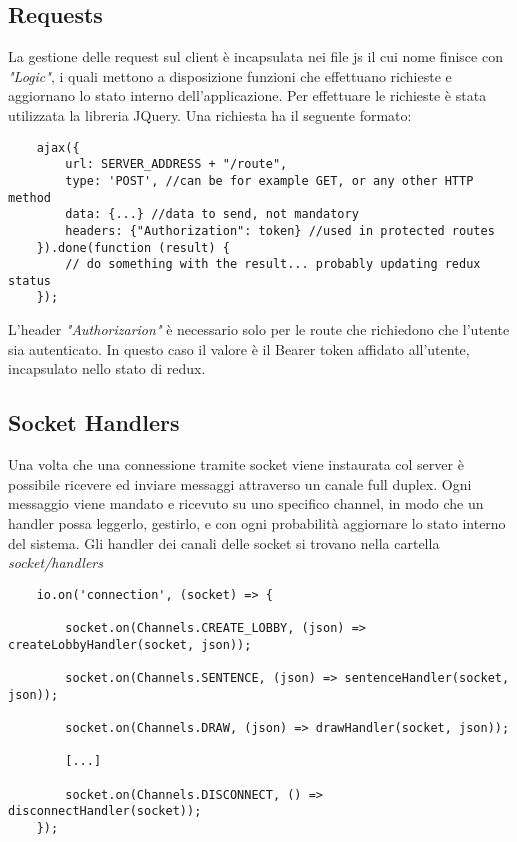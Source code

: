 \subsection{Requests}
La gestione delle request sul client è incapsulata nei file js il cui nome finisce con \textit{"Logic"}, i quali mettono a disposizione funzioni che effettuano richieste e aggiornano lo stato interno dell'applicazione.\newline
Per effettuare le richieste è stata utilizzata la libreria JQuery. Una richiesta ha il seguente formato: 
\begin{verbatim}
    ajax({
    	url: SERVER_ADDRESS + "/route",
    	type: 'POST', //can be for example GET, or any other HTTP method
    	data: {...} //data to send, not mandatory
    	headers: {"Authorization": token} //used in protected routes
    }).done(function (result) {
    	// do something with the result... probably updating redux status
    });
\end{verbatim}

L'header \textit{"Authorizarion"} è necessario solo per le route che richiedono che l'utente sia autenticato. In questo caso il valore è il Bearer token affidato all'utente, incapsulato nello stato di redux.

\subsection{Socket Handlers}
Una volta che una connessione tramite socket viene instaurata col server è possibile ricevere ed inviare messaggi attraverso un canale full duplex. Ogni messaggio viene mandato e ricevuto su uno specifico channel, in modo che un handler possa leggerlo, gestirlo, e con ogni probabilità aggiornare lo stato interno del sistema.
Gli handler dei canali delle socket si trovano nella cartella \textit{socket/handlers}
\begin{verbatim}
    io.on('connection', (socket) => {

        socket.on(Channels.CREATE_LOBBY, (json) => createLobbyHandler(socket, json));
    
        socket.on(Channels.SENTENCE, (json) => sentenceHandler(socket, json));

        socket.on(Channels.DRAW, (json) => drawHandler(socket, json));
        
        [...]
        
        socket.on(Channels.DISCONNECT, () => disconnectHandler(socket));
    });
\end{verbatim}
